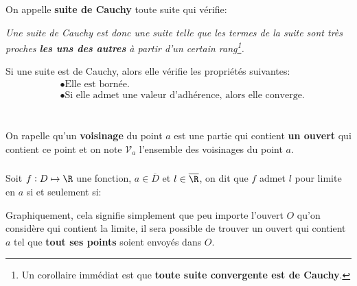 \subsection*{}
On appelle \textbf{suite de Cauchy} toute suite qui vérifie:

\begin{center}
    \textit{
        Une suite de Cauchy est donc une suite telle que les termes de la suite sont très proches \textbf{les uns des autres} à partir d'un certain rang\footnote[1]{Un corollaire immédiat est que \textbf{toute suite convergente est de Cauchy}.}.
    }
\end{center}

Si une suite est de Cauchy, alors elle vérifie les propriétés suivantes:
\begin{align*}
    &\bullet \text{Elle est bornée.} \\
    &\bullet \text{Si elle admet une valeur d'adhérence, alors elle converge.}
\end{align*}

\chapter*{} %
On rapelle qu'un \textbf{voisinage} du point \(a\) est une partie qui contient \textbf{un ouvert} qui contient ce point et on note \(\mathscr{V}_a\) l'ensemble des voisinages du point \(a\).

\subsection*{}

Soit \(f : D \mapsto \R\) une fonction, \(a \in \overline{D}\) et \(l \in \overline{\R}\), on dit que \(f\) admet \(l\) pour limite en \(a\) si et seulement si:

Graphiquement, cela signifie simplement que peu importe l'ouvert \(O\) qu'on considère qui contient la limite, il sera possible de trouver un ouvert qui contient \(a\) tel que \textbf{tout ses points} soient envoyés dans \(O\).

